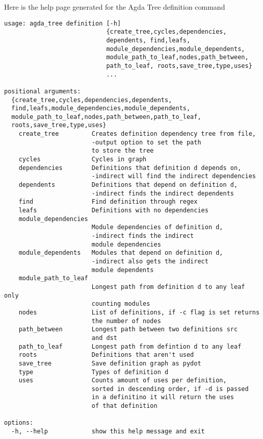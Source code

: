 \noindent
\begin{minipage}{\linewidth}
Here is the help page generated for the Agda Tree definition command
\begin{lstlisting}
usage: agda_tree definition [-h]
                            {create_tree,cycles,dependencies,
                            dependents, find,leafs,
                            module_dependencies,module_dependents,
                            module_path_to_leaf,nodes,path_between,
                            path_to_leaf, roots,save_tree,type,uses}
                            ...

positional arguments:
  {create_tree,cycles,dependencies,dependents,
  find,leafs,module_dependencies,module_dependents,
  module_path_to_leaf,nodes,path_between,path_to_leaf,
  roots,save_tree,type,uses}
    create_tree         Creates definition dependency tree from file, 
                        -output option to set the path 
                        to store the tree
    cycles              Cycles in graph
    dependencies        Definitions that definition d depends on,
                        -indirect will find the indirect dependencies
    dependents          Definitions that depend on definition d,
                        -indirect finds the indirect dependents
    find                Find definition through regex
    leafs               Definitions with no dependencies
    module_dependencies
                        Module dependencies of definition d, 
                        -indirect finds the indirect 
                        module dependencies
    module_dependents   Modules that depend on definition d, 
                        -indirect also gets the indirect 
                        module dependents
    module_path_to_leaf
                        Longest path from definition d to any leaf only
                        counting modules
    nodes               List of definitions, if -c flag is set returns 
                        the number of nodes
    path_between        Longest path between two definitions src 
                        and dst
    path_to_leaf        Longest path from defintion d to any leaf
    roots               Definitions that aren't used
    save_tree           Save definition graph as pydot
    type                Types of definition d
    uses                Counts amount of uses per definition, 
                        sorted in descending order, if -d is passed 
                        in a definitino it will return the uses 
                        of that definition

options:
  -h, --help            show this help message and exit
\end{lstlisting}
\end{minipage}

